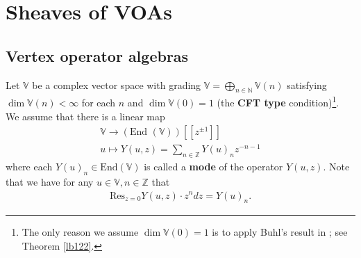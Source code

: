 \documentclass[12pt,a4paper,notitlepage]{report}
\theoremstyle{definition}
\theoremstyle{plain}
\newcommand{\End}{\mathrm{End}} %
\newcommand{\Res}{\mathrm{Res}}
\newcommand{\mbb}{\mathbb}
\newcommand{\Vbb}{\mathbb V}
\numberwithin{equation}{section}
\begin{document}
\chapter{Sheaves of VOAs}\label{lb90}





\section{Vertex operator algebras}
Let $\mbb V$ be a  complex vector space with grading $\mbb V=\bigoplus_{n\in\mathbb N}\mbb V(n)$ satisfying $\dim \mbb V(n)<\infty$ for each $n$ and $\dim\Vbb(0)=1$ (the \textbf{CFT type} condition)\footnote{The only reason we assume $\dim\Vbb(0)=1$ is to apply Buhl's result in \cite{Buhl02}; see Theorem \ref{lb122}.}.   We assume that there is a linear map
\begin{gather}
\mbb V\rightarrow(\text{End }(\mbb V))[[z^{\pm1}]]\nonumber\\
u\mapsto Y(u,z)=\sum_{n\in\mathbb Z}Y(u)_n z^{-n-1}\label{eq50}
\end{gather}
where each  $Y(u)_n\in\End(\Vbb)$ is called a \textbf{mode} of the operator $Y(u,z)$. Note that we have for any $u\in \Vbb,n\in\mbb Z$ that
\begin{align}
\Res_{z=0} Y(u,z)\cdot z^ndz=Y(u)_n.\label{eq36}
\end{align}
\end{document}
